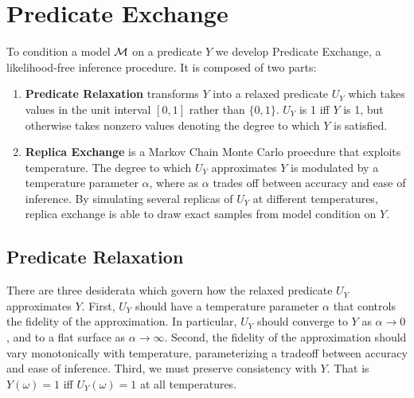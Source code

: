 \section{Predicate Exchange}
To condition a model ${\mathcal{M}}$ on a predicate $Y$ we develop Predicate Exchange, a likelihood-free inference procedure.  It is composed of two parts:
\begin{enumerate}
\item \textbf{Predicate Relaxation} transforms $Y$ into a relaxed predicate $U_Y$ which takes values in the unit interval $[0, 1]$ rather than $\{0, 1\}$.
$U_Y$ is 1 iff $Y$ is 1, but otherwise takes nonzero values denoting the degree to which $Y$ is satisfied.
\item  \textbf{Replica Exchange} is a Markov Chain Monte Carlo proecdure that exploits temperature. The degree to which $U_Y$ approximates $Y$ is modulated by a temperature parameter $\alpha$, where as $\alpha$ trades off between accuracy and ease of inference.  By simulating several replicas of $U_Y$ at different temperatures, replica exchange is able to draw exact samples from model condition on $Y$. 
\end{enumerate}

\subsection{Predicate Relaxation}

There are three desiderata which govern how the relaxed predicate $U_Y$ approximates $Y$.  First, $U_Y$ should have a temperature parameter $\alpha$ that controls the fidelity
of the approximation. In particular, $U_Y$ should converge to $Y$ as $\alpha \to 0$, and to a flat surface as $\alpha \to \infty$. Second, the fidelity of the approximation should vary monotonically with temperature, parameterizing a tradeoff between accuracy and ease of inference. Third, we must preserve consistency with $Y$. That is $Y(\omega) = 1$ iff $U_Y(\omega) = 1$ at all temperatures.  



